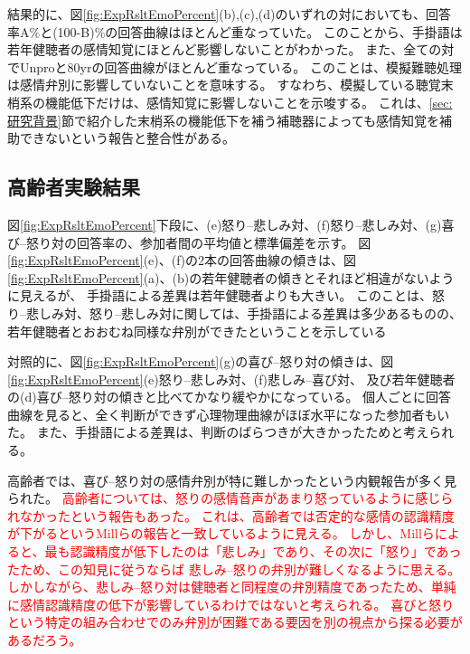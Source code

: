 結果的に、図\ref{fig:ExpRsltEmoPercent}(b),(c),(d)のいずれの対においても、回答率A\%と(100-B)\%の回答曲線はほとんど重なっていた。
このことから、手掛語は若年健聴者の感情知覚にほとんど影響しないことがわかった。
また、全ての対でUnproと80yrの回答曲線がほとんど重なっている。
このことは、模擬難聴処理は感情弁別に影響していないことを意味する。
すなわち、模擬している聴覚末梢系の機能低下だけは、感情知覚に影響しないことを示唆する。
これは、\ref{sec:研究背景}節で紹介した末梢系の機能低下を補う補聴器によっても感情知覚を補助できないという報告\cite{goy2018hearing}と整合性がある。


\subsection{高齢者実験結果}
図\ref{fig:ExpRsltEmoPercent}下段に、(e)怒り--悲しみ対、(f)怒り--悲しみ対、(g)喜び--怒り対の回答率の、参加者間の平均値と標準偏差を示す。
図\ref{fig:ExpRsltEmoPercent}(e)、(f)の2本の回答曲線の傾きは、図\ref{fig:ExpRsltEmoPercent}(a)、(b)の若年健聴者の傾きとそれほど相違がないように見えるが、
手掛語による差異は若年健聴者よりも大きい。
このことは、怒り--悲しみ対、怒り--悲しみ対に関しては、手掛語による差異は多少あるものの、若年健聴者とおおむね同様な弁別ができたということを示している

対照的に、図\ref{fig:ExpRsltEmoPercent}(g)の喜び--怒り対の傾きは、図\ref{fig:ExpRsltEmoPercent}(e)怒り--悲しみ対、(f)悲しみ--喜び対、
及び若年健聴者の(d)喜び--怒り対の傾きと比べてかなり緩やかになっている。
個人ごとに回答曲線を見ると、全く判断ができず心理物理曲線がほぼ水平になった参加者もいた。
また、手掛語による差異は、判断のばらつきが大きかったためと考えられる。

高齢者では、喜び--怒り対の感情弁別が特に難しかったという内観報告が多く見られた。
\textcolor{red}{
  高齢者については、怒りの感情音声があまり怒っているように感じられなかったという報告もあった。
  これは、高齢者では否定的な感情の認識精度が下がるというMillらの報告\cite{mill2009age}と一致しているように見える。
  しかし、Millらによると、最も認識精度が低下したのは「悲しみ」であり、その次に「怒り」であったため、この知見に従うならば
  悲しみ--怒りの弁別が難しくなるように思える。
  しかしながら、悲しみ--怒り対は健聴者と同程度の弁別精度であったため、単純に感情認識精度の低下が影響しているわけではないと考えられる。
  喜びと怒りという特定の組み合わせでのみ弁別が困難である要因を別の視点から探る必要があるだろう。
}

